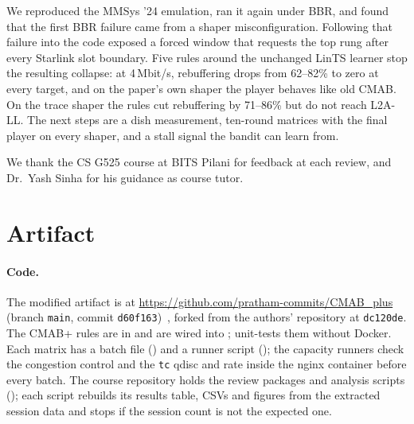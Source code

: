 \documentclass[sigconf]{acmart}
\newcommand{\cmabp}{CMAB+\xspace}
\newcommand{\oldcmab}{old CMAB\xspace}
\begin{document}
We reproduced the MMSys '24 emulation, ran it again under BBR, and found that the first BBR failure came from a shaper misconfiguration. Following that failure into the code exposed a forced window that requests the top rung after every Starlink slot boundary. Five rules around the unchanged LinTS learner stop the resulting collapse: at 4\,Mbit/s, rebuffering drops from 62--82\% to zero at every target, and on the paper's own shaper the player behaves like \oldcmab. On the trace shaper the rules cut rebuffering by 71--86\% but do not reach L2A-LL. The next steps are a dish measurement, ten-round matrices with the final player on every shaper, and a stall signal the bandit can learn from.

\begin{acks}
We thank the CS G525 course at BITS Pilani for feedback at each review, and Dr.~Yash Sinha for his guidance as course tutor.
\end{acks}

\label{body:end}

\balance



\appendix

\section{Artifact}
\label{app:artifact}

\paragraph{Code.} The modified artifact is at \url{https://github.com/pratham-commits/CMAB_plus} (branch \texttt{main}, commit \texttt{d60f163})~\cite{cmabplus}, forked from the authors' repository at \texttt{dc120de}. The \cmabp rules are in  and are wired into ;  unit-tests them without Docker. Each matrix has a batch file () and a runner script (); the capacity runners check the congestion control and the \texttt{tc} qdisc and rate inside the nginx container before every batch. The course repository holds the review packages and analysis scripts (); each script rebuilds its results table, CSVs and figures from the extracted session data and stops if the session count is not the expected one.
\end{document}
